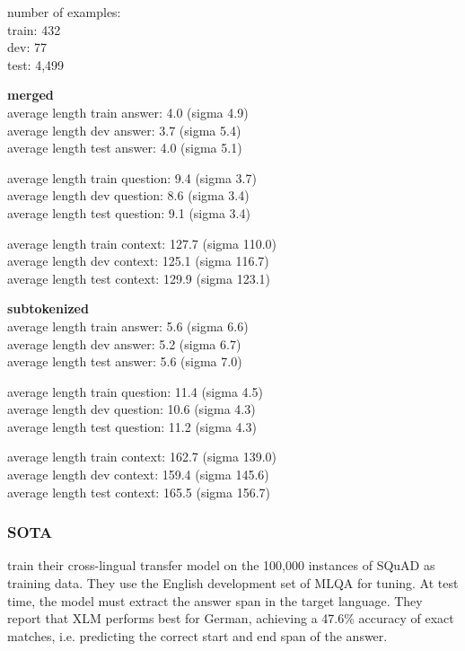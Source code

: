 number of examples: \\
train: 432 \\
dev: 77 \\
test: 4,499

\textbf{merged} \\
average length train answer: 4.0 (sigma 4.9) \\
average length dev answer: 3.7 (sigma 5.4) \\
average length test answer: 4.0 (sigma 5.1)

average length train question: 9.4 (sigma 3.7) \\
average length dev question: 8.6 (sigma 3.4) \\
average length test question: 9.1 (sigma 3.4)

average length train context: 127.7 (sigma 110.0) \\
average length dev context: 125.1 (sigma 116.7) \\
average length test context: 129.9 (sigma 123.1)

\textbf{subtokenized} \\
average length train answer: 5.6 (sigma 6.6) \\
average length dev answer: 5.2 (sigma 6.7) \\
average length test answer: 5.6 (sigma 7.0)

average length train question: 11.4 (sigma 4.5) \\
average length dev question: 10.6 (sigma 4.3) \\
average length test question: 11.2 (sigma 4.3)

average length train context: 162.7 (sigma 139.0) \\
average length dev context: 159.4 (sigma 145.6) \\
average length test context: 165.5 (sigma 156.7)

\subsubsection{SOTA}

\cite{lewis2019mlqa} train their cross-lingual transfer model on the 100,000 instances of SQuAD
\cite{rajpurkar2016squad} as training data.
They use the English development set of MLQA for tuning.
At test time, the model must extract the answer span in the target language.
They report that XLM performs best for German, achieving a 47.6\% accuracy of exact matches, i.e.
predicting the correct start and end span of the answer.

